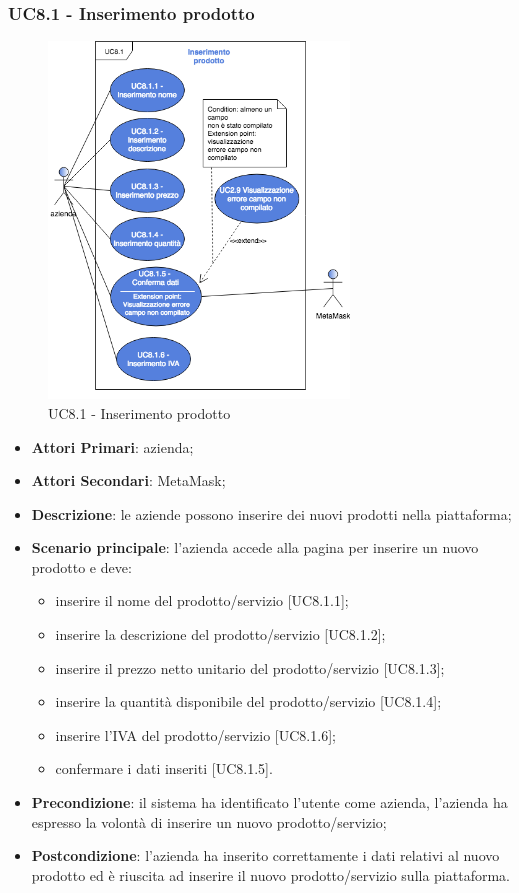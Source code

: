 \subsubsection{UC8.1 - Inserimento prodotto}
\begin{figure}[H]
	\includegraphics[width=8cm]{res/images/UC8-Inserimento.png}
	\centering
	\caption{UC8.1 - Inserimento prodotto}
\end{figure}
\begin{itemize}
	\item \textbf{Attori Primari}: azienda;
	\item \textbf{Attori Secondari}: MetaMask\glo;
	\item \textbf{Descrizione}: le aziende possono inserire dei nuovi prodotti nella piattaforma;
	\item \textbf{Scenario principale}: l'azienda accede alla pagina per inserire un nuovo prodotto e deve:
	\begin{itemize}
		\item inserire il nome del prodotto/servizio [UC8.1.1];
		\item inserire la descrizione del prodotto/servizio [UC8.1.2];
		\item inserire il prezzo netto unitario del prodotto/servizio [UC8.1.3];
		\item inserire la quantità disponibile del prodotto/servizio [UC8.1.4];
		\item inserire l'IVA del prodotto/servizio [UC8.1.6];
		\item confermare i dati inseriti [UC8.1.5].
		
	\end{itemize}
	\item \textbf{Precondizione}: il sistema ha identificato l'utente come azienda, l'azienda ha espresso la volontà di inserire un nuovo prodotto/servizio;
	\item \textbf{Postcondizione}: l'azienda ha inserito correttamente i dati relativi al nuovo prodotto ed è riuscita ad inserire il nuovo prodotto/servizio sulla piattaforma.	
\end{itemize}
